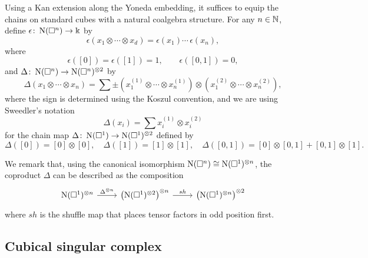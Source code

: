 Using a Kan extension along the Yoneda embedding, it suffices to equip the chains on standard cubes with a natural coalgebra structure.
For any $n \in \mathbb{N}$, define $\epsilon \colon \operatorname{N}(\square^n) \to \Bbbk$ by
\begin{equation*}
\epsilon \left( x_1 \otimes \cdots \otimes x_d \right) = \epsilon(x_1) \cdots \, \epsilon(x_n),
\end{equation*}
where
\begin{equation*}
\epsilon([0]) = \epsilon([1]) = 1, \qquad \epsilon([0, 1]) = 0,
\end{equation*} 
and $\Delta \colon \operatorname{N}(\square^n) \to \operatorname{N}(\square^n)^{\otimes 2}$ by
\begin{equation*}	
\Delta (x_1 \otimes \cdots \otimes x_n) = 	
\sum \pm \left( x_1^{(1)} \otimes \cdots \otimes x_n^{(1)} \right) \otimes 	
\left( x_1^{(2)} \otimes \cdots \otimes x_n^{(2)} \right),	
\end{equation*}	
where the sign is determined using the Koszul convention, and we are using Sweedler's notation
\begin{equation*}	
\Delta(x_i) = \sum x_i^{(1)} \otimes x_i^{(2)}
\end{equation*}
for the chain map $\Delta \colon \operatorname{N}(\square^1) \to \operatorname{N}(\square^1)^{\otimes 2}$ defined by
\begin{equation*}
\Delta([0]) = [0] \otimes [0], \quad \Delta([1]) = [1] \otimes [1], \quad \Delta([0,1]) = [0] \otimes [0,1] + [0,1] \otimes [1].
\end{equation*}

We remark that, using the canonical isomorphism $\operatorname{N}(\square^n) \cong \operatorname{N}(\square^1)^{\otimes n}$, the coproduct $\Delta$ can be described as the composition
\begin{equation*}
\begin{tikzcd}
\chains(\square^1)^{\otimes n} \arrow[r, "\Delta^{\otimes n}"] & \left( \chains(\square^1)^{\otimes 2}  \right)^{\otimes n} \arrow[r, "sh"] & \left( \chains(\square^1)^{\otimes n} \right)^{\otimes 2}
\end{tikzcd}
\end{equation*}
where $sh$ is the shuffle map that places tensor factors in odd position first. \vspace*{5pt} \\

\subsection{Cubical singular complex}

